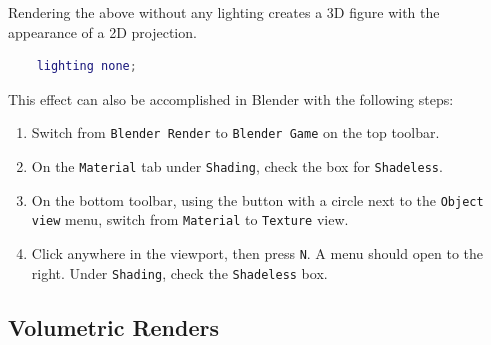 \documentclass[12pt]{exam}
\begin{document}
	Rendering the above without any lighting creates a 3D figure with the appearance of a 2D projection.
	\begin{lstlisting}[language=matlab]
	% Turn off lighting for the active window
	lighting none;\end{lstlisting}
	This effect can also be accomplished in Blender with the following steps:
	\begin{enumerate}
		\item Switch from \texttt{Blender Render} to \texttt{Blender Game} on the top toolbar.
		\item On the \texttt{Material} tab under \texttt{Shading}, check the box for \texttt{Shadeless}. 
		\item On the bottom toolbar, using the button with a circle next to the \texttt{Object view} menu, switch from \texttt{Material} to \texttt{Texture} view.
		\item Click anywhere in the viewport, then press \texttt{N}. A menu should open to the right. Under \texttt{Shading}, check the \texttt{Shadeless} box.
	\end{enumerate}
	\subsection{Volumetric Renders}
\end{document}
